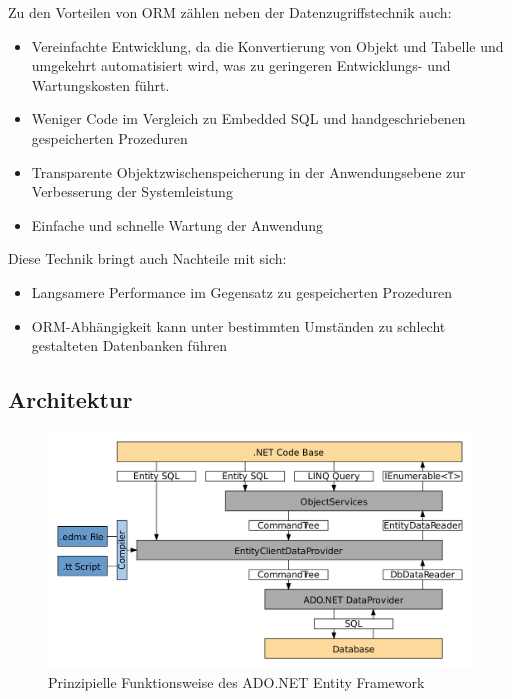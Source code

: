 Zu den Vorteilen von ORM zählen neben der Datenzugriffstechnik auch:

\begin{itemize}
    \item Vereinfachte Entwicklung, da die Konvertierung von Objekt und Tabelle und umgekehrt
    automatisiert wird, was zu geringeren Entwicklungs- und Wartungskosten führt.
    \item Weniger Code im Vergleich zu Embedded SQL und handgeschriebenen gespeicherten
    Prozeduren
    \item Transparente Objektzwischenspeicherung in der Anwendungsebene zur Verbesserung der
    Systemleistung
    \item Einfache und schnelle Wartung der Anwendung
\end{itemize}

Diese Technik bringt auch Nachteile mit sich:

\begin{itemize}
    \item Langsamere Performance im Gegensatz zu gespeicherten Prozeduren
    \item ORM-Abhängigkeit kann unter bestimmten Umständen zu schlecht gestalteten
    Datenbanken führen
\end{itemize}

\subsection{Architektur}

\begin{figure}[h]
    \begin{center}
        \includegraphics*[width=16cm]{pics/ADO_NET_EF.png}
        \caption[Prinzipielle Funktionsweise des ADO.NET Entity Framework]{Prinzipielle Funktionsweise des ADO.NET Entity Framework \cite{ArchitekturEF}}
    \end{center}
\end{figure}

